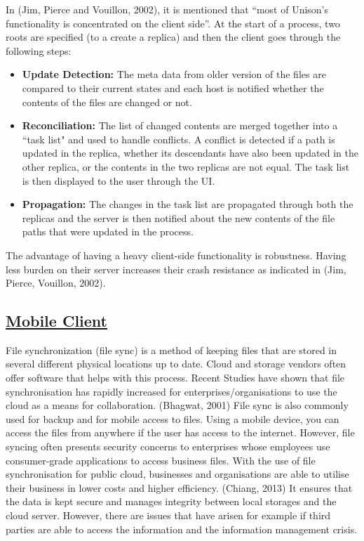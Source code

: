 \documentclass{article}
\begin{document}
In (Jim, Pierce and Vouillon, 2002), it is mentioned that “most of Unison’s functionality is concentrated on the client side”. At the start of a process, two roots are specified (to a create a replica) and then the client goes through the following steps:
\begin{itemize}
\item \textbf{Update Detection:} The meta data from older version of the files are compared to their current states and each host is notified whether the contents of the files are changed or not.
\item \textbf{Reconciliation:} The list of changed contents are merged together into a “task list" and used to handle conflicts. A conflict is detected if a path is updated in the replica, whether its descendants have also been updated in the other replica, or the contents in the two replicas are not equal. The task list is then displayed to the user through the UI.
\item \textbf{Propagation:} The changes in the task list are propagated through both the replicas and the server is then notified about the new contents of the file paths that were updated in the process.
\end{itemize}
The advantage of having a heavy client-side functionality is robustness. Having less burden on their server increases their crash resistance as indicated in (Jim, Pierce, Vouillon, 2002).

\subsection{\underline{Mobile Client}}
File synchronization (file sync) is a method of keeping files that are stored in several different physical locations up to date. Cloud and storage vendors often offer software that helps with this process. Recent Studies have shown that file synchronisation has rapidly increased for enterprises/organisations to use the cloud as a means for collaboration. (Bhagwat, 2001) File sync is also commonly used for backup and for mobile access to files. Using a mobile device, you can access the files from anywhere if the user has access to the internet. However, file syncing often presents security concerns to enterprises whose employees use consumer-grade applications to access business files. With the use of file synchronisation for public cloud, businesses and organisations are able to utilise their business in lower costs and higher efficiency. (Chiang, 2013) It ensures that the data is kept secure and manages integrity between local storages and the cloud server. However, there are issues that have arisen for example if third parties are able to access the information and the information management crisis.
\end{document}

